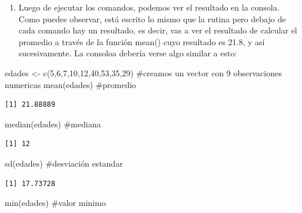 \documentclass[
  letterpaper,
  DIV=11,
  numbers=noendperiod]{scrreprt}
\newenvironment{Shaded}{\begin{snugshade}}{\end{snugshade}}
\newcommand{\CommentTok}[1]{\textcolor[rgb]{0.37,0.37,0.37}{#1}}
\newcommand{\DecValTok}[1]{\textcolor[rgb]{0.68,0.00,0.00}{#1}}
\newcommand{\FunctionTok}[1]{\textcolor[rgb]{0.28,0.35,0.67}{#1}}
\newcommand{\NormalTok}[1]{\textcolor[rgb]{0.00,0.23,0.31}{#1}}
\newcommand{\OtherTok}[1]{\textcolor[rgb]{0.00,0.23,0.31}{#1}}
\providecommand{\tightlist}{%
  \setlength{\itemsep}{0pt}\setlength{\parskip}{0pt}}\usepackage{longtable,booktabs,array}
\begin{document}
\begin{enumerate}
\def\labelenumi{\arabic{enumi}.}
\setcounter{enumi}{1}
\tightlist
\item
  Luego de ejecutar los comandos, podemos ver el resultado en la
  consola. Como puedes observar, está escrito lo mismo que la rutina
  pero debajo de cada comando hay un resultado, es decir, vas a ver el
  resultado de calcular el promedio a través de la función mean() cuyo
  resultado es 21.8, y así sucesivamente. La consoloa debería verse algo
  similar a esto:
\end{enumerate}

\begin{Shaded}
\begin{Highlighting}[]
\NormalTok{edades }\OtherTok{\textless{}{-}} \FunctionTok{c}\NormalTok{(}\DecValTok{5}\NormalTok{,}\DecValTok{6}\NormalTok{,}\DecValTok{7}\NormalTok{,}\DecValTok{10}\NormalTok{,}\DecValTok{12}\NormalTok{,}\DecValTok{40}\NormalTok{,}\DecValTok{53}\NormalTok{,}\DecValTok{35}\NormalTok{,}\DecValTok{29}\NormalTok{) }\CommentTok{\#creamos un vector con 9 observaciones numericas }
\FunctionTok{mean}\NormalTok{(edades)   }\CommentTok{\#promedio }
\end{Highlighting}
\end{Shaded}

\begin{verbatim}
[1] 21.88889
\end{verbatim}

\begin{Shaded}
\begin{Highlighting}[]
\FunctionTok{median}\NormalTok{(edades) }\CommentTok{\#mediana }
\end{Highlighting}
\end{Shaded}

\begin{verbatim}
[1] 12
\end{verbatim}

\begin{Shaded}
\begin{Highlighting}[]
\FunctionTok{sd}\NormalTok{(edades)     }\CommentTok{\#desviación estandar }
\end{Highlighting}
\end{Shaded}

\begin{verbatim}
[1] 17.73728
\end{verbatim}

\begin{Shaded}
\begin{Highlighting}[]
\FunctionTok{min}\NormalTok{(edades)    }\CommentTok{\#valor minimo }
\end{Highlighting}
\end{Shaded}
\end{document}

